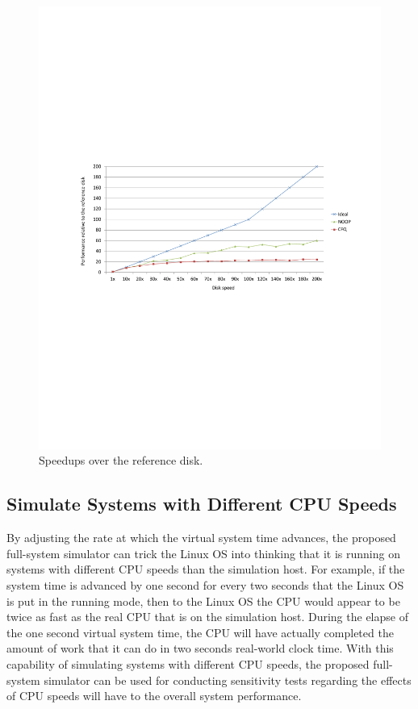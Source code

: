 \begin{figure}[htpb]
	\centering
	\includegraphics[trim=2cm 10cm 2cm 9.5cm, width=\textwidth]{figures/ch5-speedup-over-reference.pdf}
	\caption{\label{fig:ch5-speedup-over-reference}Speedups over the reference disk.}
\end{figure}


\subsection{Simulate Systems with Different CPU Speeds}

By adjusting the rate at which the virtual system time advances, the proposed full-system simulator can trick the Linux OS into thinking that it is running on systems with different CPU speeds than the simulation host. For example, if the system time is advanced by one second for every two seconds that the Linux OS is put in the running mode, then to the Linux OS the CPU would appear to be twice as fast as the real CPU that is on the simulation host. During the elapse of the one second virtual system time, the CPU will have actually completed the amount of work that it can do in two seconds real-world clock time. With this capability of simulating systems with different CPU speeds, the proposed full-system simulator can be used for conducting sensitivity tests regarding the effects of CPU speeds will have to the overall system performance.

